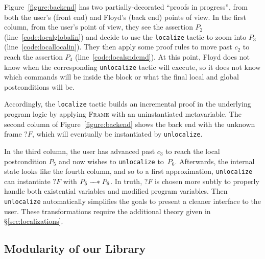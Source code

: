 \documentclass[acmsmall,screen]{acmart}
\newcommand{\li}[1]{{\texttt{\small #1}}}
\newcommand{\scon}{\mathbin{\star}}
\renewcommand{\scon}{\mathbin{\ast}} \renewcommand{\bigstar}{\raisebox{-0.24em}{{\scaleobj{2.5}{\scon}}}}
\newcommand{\wand}{\mathrel{\mbox{$\hspace*{-0.03em}\mathord{-}\hspace*{-0.4em}
  \mathord{-}\hspace*{-0.13em}
     \mathord{\scon}$\hspace*{-0.005em}}}}
\newcommand{\infrulestyle}[1]{\textsc{#1}}
\begin{document}
Figure~\ref{figure:backend} has two partially-decorated ``proofs in progress'', from both the user's (front end) and Floyd's (back end) points of view.  In the first column, from the user's point of view, they see the assertion $P_2$ (line~\ref{code:localglobalin}) and decide to use the \li{localize} tactic to zoom into $P_3$ (line~\ref{code:locallocalin}).  They then apply some proof rules to move past $c_2$ to reach the assertion $P_4$ (line~\ref{code:localsndcmd}).  At this point, Floyd does not know when the corresponding \li{unlocalize} tactic will execute, so it does not know which commands will be inside the block or what the final local and global postconditions will be.

Accordingly, the \li{localize} tactic builds an incremental proof in the underlying program logic by applying \infrulestyle{Frame} with an uninstantiated metavariable.
The second column of Figure~\ref{figure:backend} shows the back end with the unknown frame $?F$, which will eventually be instantiated by \li{unlocalize}.

In the third column, the user has advanced past $c_3$ to reach the local postcondition $P_5$ and now wishes to \li{unlocalize} to~$P_6$.  Afterwards, the internal state looks like the fourth column, and so to a first approximation, \li{unlocalize} can instantiate $?F$ with $P_5 \wand P_6$.  In truth, $?F$ is chosen more subtly to properly handle both existential variables and modified program variables. Then \li{unlocalize} automatically simplifies the goals to present a cleaner interface to the user.  These transformations require the additional theory given in \S\ref{sec:localizations}.

\subsection{Modularity of our Library}
\label{sec:modularlibrary}
\end{document}
